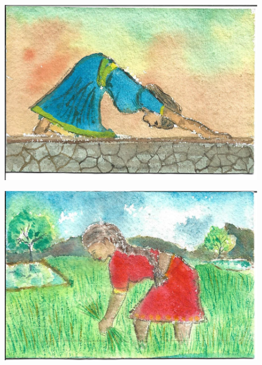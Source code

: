 \documentclass[12pt]{article}
\begin{document}
\begin{figure}[h!]
\centering
\includegraphics[width=.7\paperwidth]{pictures/LE}
\end{figure}

\newpage

\begin{figure}[h!]
\centering
\includegraphics[width=.7\paperwidth]{pictures/AW}
\end{figure}

\newpage
\end{document}
